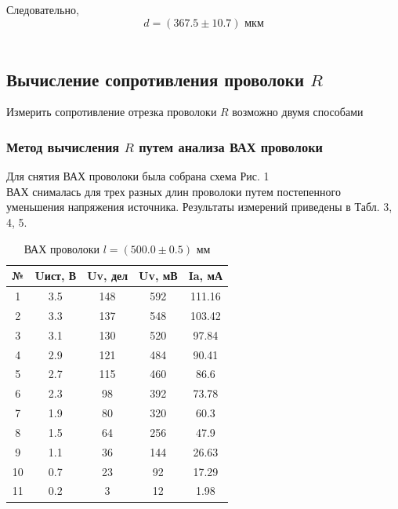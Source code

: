 \documentclass{article}
\begin{document}
	Следовательно,\\
	$$d = (367.5 \pm 10.7) \text{ мкм}$$\\
	
	
	\subsection{Вычисление сопротивления проволоки $R$}
	Измерить сопротивление отрезка проволоки $R$ возможно двумя способами
	
	\subsubsection{Метод вычисления $R$ путем анализа ВАХ проволоки}
	Для снятия ВАХ проволоки была собрана схема Рис. 1\\
	ВАХ снималась для трех разных длин проволоки путем постепенного уменьшения напряжения источника. Результаты измерений приведены в Табл. 3, 4, 5.
	\\
	
	
	\begin{table}[H]
		\centering
		\begin{tabular}{|c|c|c|c|c|}
			\hline
			№ & Uист, В & Uv, дел & Uv, мВ & Ia, мА \\ \hline
			1 & 3.5 & 148 & 592 & 111.16 \\ \hline
			2 & 3.3 & 137 & 548 & 103.42 \\ \hline
			3 & 3.1 & 130 & 520 & 97.84 \\ \hline
			4 & 2.9 & 121 & 484 & 90.41 \\ \hline
			5 & 2.7 & 115 & 460 & 86.6 \\ \hline
			6 & 2.3 & 98 & 392 & 73.78 \\ \hline
			7 & 1.9 & 80 & 320 & 60.3 \\ \hline
			8 & 1.5 & 64 & 256 & 47.9 \\ \hline
			9 & 1.1 & 36 & 144 & 26.63 \\ \hline
			10 & 0.7 & 23 & 92 & 17.29 \\ \hline
			11 & 0.2 & 3 & 12 & 1.98 \\ \hline
		\end{tabular}
		\caption{ВАХ проволоки $l = (500.0 \pm 0.5)$ мм}
	\end{table}
	
\end{document}
